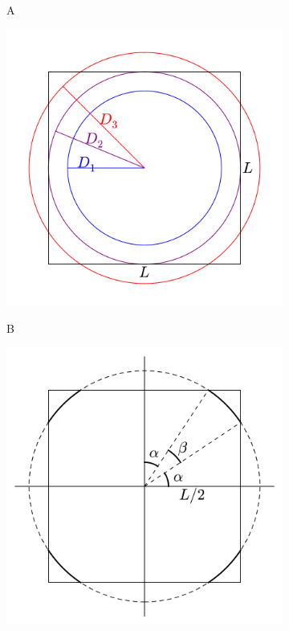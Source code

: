 \begin{figure}[h]
\centering
\begin{subfigure}[b]{0.49\textwidth}
	  \begin{flushleft}
	  \large A
		\end{flushleft}
    \centering
    \includegraphics[width=\textwidth]{mask.pdf}
    \label{subfig:mask_radius}
\end{subfigure}
\begin{subfigure}[b]{0.49\textwidth}
	  \begin{flushleft}
	  \large B
		\end{flushleft}
    \centering
    \includegraphics[width=\textwidth]{mask_angles.pdf}

\end{subfigure}
\end{figure}
